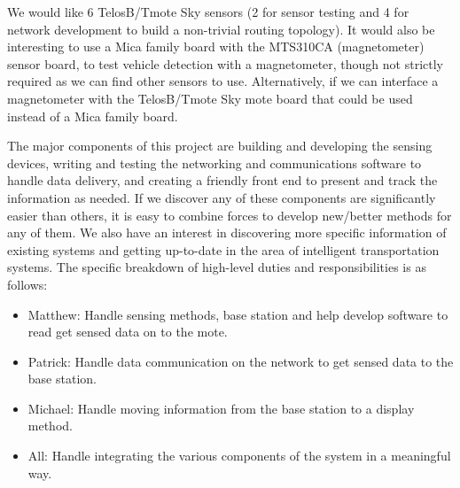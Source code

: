 \documentclass[11pt]{article}
\begin{document}
We would like 6 TelosB/Tmote Sky sensors (2 for sensor testing and 4 for network
development to build a non-trivial routing topology).
It would also be interesting to use a Mica family board with the MTS310CA
(magnetometer) sensor board, to test vehicle detection with a magnetometer,
though not strictly required as we can find other sensors to use.
Alternatively, if we can interface a magnetometer with the TelosB/Tmote Sky
mote board that could be used instead of a Mica family board.

The major components of this project are building and developing the sensing
devices, writing and testing the networking and communications
software to handle data delivery, and creating a friendly front end to present
and track the information as needed.
If we discover any of these components are significantly easier than others, it
is easy to combine forces to develop new/better methods for any of them.
We also have an interest in discovering more specific information of existing
systems and getting up-to-date in the area of intelligent transportation
systems.  The specific breakdown of high-level duties and responsibilities is as
follows:

\begin{itemize}
    \item Matthew: Handle sensing methods, base station and help develop software to read get
    sensed data on to the mote.
    \item Patrick: Handle data communication on the network to get sensed data
    to the base station.
    \item Michael: Handle moving information from the base station to a display
    method.
    \item All: Handle integrating the various components of the system in a
    meaningful way.
\end{itemize}
\end{document}
